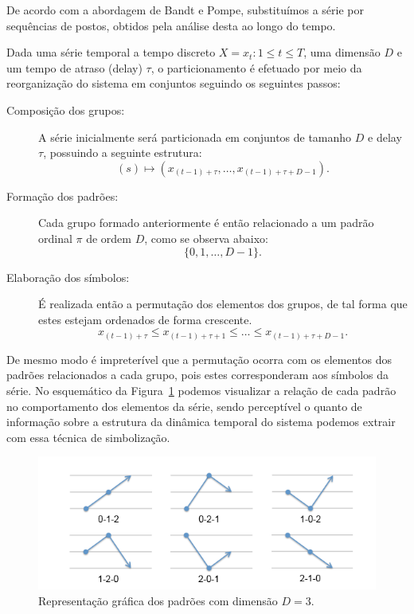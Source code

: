 De acordo com a abordagem de Bandt e Pompe, substituímos a série por sequências de postos, obtidos pela análise desta ao longo do tempo.

Dada uma série temporal a tempo discreto $X = {x_t:1\leq t\leq T}$, uma dimensão $D$ e um tempo de atraso (delay) $\tau$, o particionamento é efetuado por meio da reorganização do sistema em conjuntos seguindo os seguintes passos:

\begin{description}
\item[Composição dos grupos:] A série inicialmente será particionada em conjuntos de tamanho $D$ e delay $\tau$, possuindo a seguinte estrutura: 
		 $$(s) \mapsto (x_{(t-1)+\tau},\ldots, x_{(t-1)+\tau+D-1}).$$  

\item[Formação dos padrões:] Cada grupo formado anteriormente é então relacionado a um padrão ordinal $\pi$ de ordem $D$, como se observa abaixo:
		$$ \{0, 1,\ldots, D-1\}. $$

\item[Elaboração dos símbolos:] É realizada então a permutação dos elementos dos grupos, de tal forma que estes estejam ordenados de forma crescente. 
		$$ x_{(t-1)+\tau} \leq x_{(t-1)+\tau+1} \leq \ldots \leq x_{(t-1)+\tau+D-1}. $$ 
\end{description}

De mesmo modo é impreterível que a permutação ocorra com os elementos dos padrões relacionados a cada grupo, pois estes corresponderam aos símbolos da série. No esquemático da Figura~\ref{fig:patterns} podemos visualizar a relação de cada padrão no comportamento dos elementos da série, sendo perceptível o quanto de informação sobre a estrutura da dinâmica temporal do sistema podemos extrair com essa técnica de simbolização.

\begin{figure}[!ht]
	\begin{center}
		\includegraphics[width=0.6\columnwidth]{capitulos/imagens/padroes.png}
        \caption{Representação gráfica dos padrões com dimensão $D=3$.}
	\label{fig:patterns}
	\end{center}
\end{figure}

